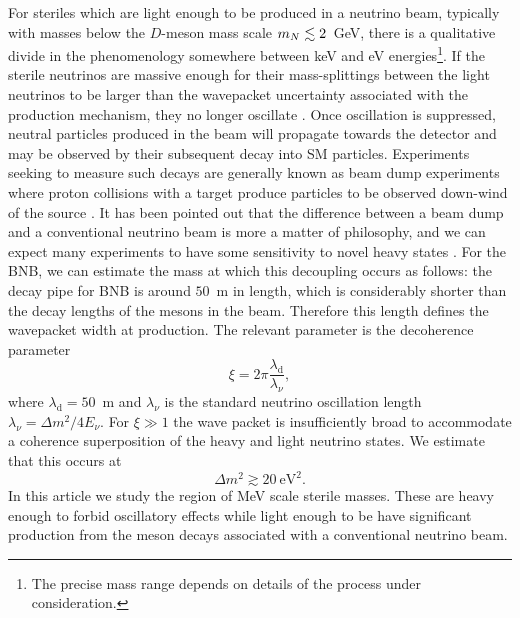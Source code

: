\documentclass[11pt, a4paper]{article}
\def\ster{\ensuremath N}
\begin{document}
For steriles which are light enough to be produced in a neutrino beam,
typically with masses below the $D$-meson mass scale $m_{\ster} \lesssim
2$~GeV, there is a qualitative divide in the phenomenology somewhere between
keV and eV energies\footnote{The precise mass range depends on details of the
process under consideration.}. If the sterile neutrinos are massive enough for
their mass-splittings between the light neutrinos to be larger than the
wavepacket uncertainty associated with the production mechanism, they no longer
oscillate \cite{Akhmedov:2009rb}.  
%
Once oscillation is suppressed, neutral particles produced in the beam will
propagate towards the detector and may be observed by their subsequent decay
into SM particles. Experiments seeking to measure such decays are generally
known as beam dump experiments where proton collisions with a target produce
particles to be observed down-wind of the source \cite{CooperSarkar:1985nh,
Bergsma:1985is, Vaitaitis:1999wq, Bernardi:1985ny, Bernardi:1987ek,
Anelli:2015pba, Alekhin:2015byh}. It has been pointed out that the difference
between a beam dump and a conventional neutrino beam is more a matter of
philosophy, and we can expect many experiments to have some sensitivity to
novel heavy states \cite{Gorbunov:2007ak, Asaka:2012bb, Adams:2013qkq}. 
%
For the BNB, we can estimate the mass at which this decoupling occurs as
follows: the decay pipe for BNB is around $50$~m in length, which is
considerably shorter than the decay lengths of the mesons in the beam.
Therefore this length defines the wavepacket width at production.  The relevant
parameter is the decoherence parameter \cite{Akhmedov:2009rb, Hernandez:2011rs}
%
\[  \xi = 2\pi \frac{\lambda_\text{d}}{\lambda_\nu}, \]
%
where $\lambda_\text{d} = 50$~m and $\lambda_\nu$ is the standard neutrino
oscillation length $\lambda_\nu = \Delta m^2/4E_\nu$. For $\xi\gg1$ the wave
packet is insufficiently broad to accommodate a coherence superposition of the
heavy and light neutrino states. We estimate that this occurs at 
%
\[  \Delta m^2 \gtrsim 20~\text{eV}^2. \] 
%
In this article we study the region of MeV scale sterile masses. These are
heavy enough to forbid oscillatory effects while light enough to be have
significant production from the meson decays associated with a conventional
neutrino beam. 
\end{document}
